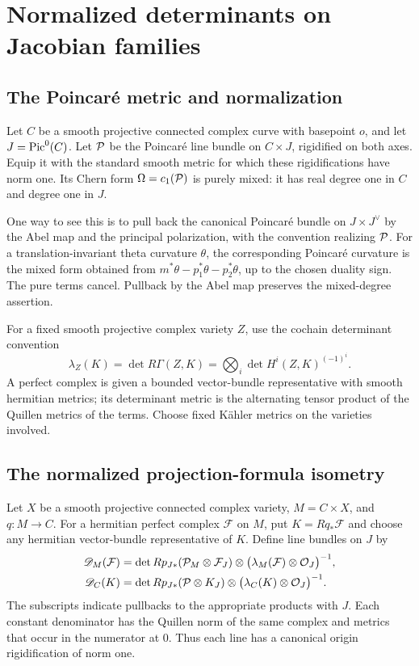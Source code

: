 \section{Normalized determinants on Jacobian families}\label{sec:metrics}

\subsection{The Poincaré metric and normalization}\label{sec:poincare-metric}

Let \(C\) be a smooth projective connected complex curve with
basepoint \(o\), and let \(J=\operatorname{Pic}^0(C)\). Let \(\mathcal P\) be the
Poincaré line bundle on \(C\times J\), rigidified on both axes.
Equip it with the standard smooth metric for which these
rigidifications have norm one. Its Chern form
\(\Omega=c_1(\mathcal P)\) is purely mixed: it has real degree one in
\(C\) and degree one in \(J\).

One way to see this is to pull back the canonical Poincaré bundle
on \(J\times J^\vee\) by the Abel map and the principal
polarization, with the convention realizing \(\mathcal P\). For a
translation-invariant theta curvature \(\theta\), the corresponding
Poincaré curvature is the mixed form obtained from
\(m^*\theta-p_1^*\theta-p_2^*\theta\), up to the chosen duality
sign. The pure terms cancel. Pullback by the Abel map preserves
the mixed-degree assertion.

For a fixed smooth projective complex variety \(Z\), use the
cochain determinant convention
\[
 \lambda_Z(K)=\det R\Gamma(Z,K)
       =\bigotimes_i\det H^i(Z,K)^{(-1)^i}.
\]
A perfect complex is given a bounded vector-bundle representative
with smooth hermitian metrics; its determinant metric is the
alternating tensor product of the Quillen metrics of the terms.
Choose fixed Kähler metrics on the varieties involved.

\subsection{The normalized projection-formula isometry}
\label{sec:quillen-proof}

Let \(X\) be a smooth projective connected complex variety,
\(M=C\times X\), and \(q:M\to C\). For a hermitian perfect
complex \(\mathcal F\) on \(M\), put \(K=Rq_*\mathcal F\)
and choose any hermitian vector-bundle representative of \(K\).
Define line bundles on \(J\) by
\begin{align*}
 \mathscr D_M(\mathcal F)
  &=\det Rp_{J*}(\mathcal P_M\otimes\mathcal F_J)
     \otimes\bigl(\lambda_M(\mathcal F)\otimes\mathcal O_J\bigr)^{-1},\\
 \mathscr D_C(K)
  &=\det Rp_{J*}(\mathcal P\otimes K_J)
     \otimes\bigl(\lambda_C(K)\otimes\mathcal O_J\bigr)^{-1}.
\end{align*}
The subscripts indicate pullbacks to the appropriate products with
\(J\). Each constant denominator has the Quillen norm of the same
complex and metrics that occur in the numerator at \(0\).
Thus each line has a canonical origin rigidification of norm one.

